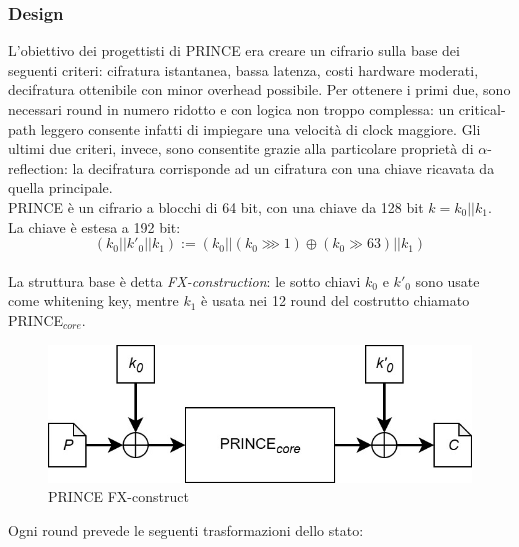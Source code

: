 \documentclass[target=bach,aauheader=,style=]{thud}
\begin{document}
			\subsubsection{Design}
			L'obiettivo dei progettisti di PRINCE era creare un cifrario sulla base dei seguenti criteri: cifratura istantanea, bassa latenza, costi hardware moderati, decifratura ottenibile con minor overhead possibile.
			Per ottenere i primi due, sono necessari round in numero ridotto e con logica non troppo complessa: un critical-path leggero consente infatti di impiegare una velocità di clock maggiore.
			Gli ultimi due criteri, invece, sono consentite grazie alla particolare proprietà di $\alpha$-reflection: la decifratura corrisponde ad un cifratura con una chiave ricavata da quella principale.\\
			PRINCE è un cifrario a blocchi di 64 bit, con una chiave da 128 bit $k = k_0 || k_1$. La chiave è estesa a 192 bit:
			\[(k_0||k'_0||k_1) := (k_0 || (k_0 \ggg 1) \oplus (k_0 \gg 63) || k_1)\]\\
			La struttura base è detta \textit{FX-construction}: le sotto chiavi $k_0$ e $k'_0$ sono usate come whitening key, mentre $k_1$ è usata nei 12 round del costrutto chiamato PRINCE$_{core}$.
			\begin{figure}[htbp]
				\centering
				\includegraphics[width=0.5\linewidth]{img/princefx.jpg}
				\caption{PRINCE FX-construct}
				\label{fig:placeholder}
			\end{figure}
			Ogni round prevede le seguenti trasformazioni dello stato:
\end{document}
